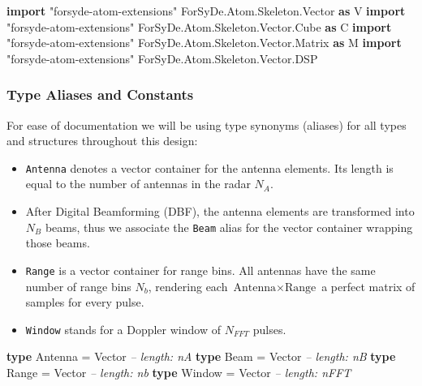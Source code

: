 \documentclass[
  a4paper,
]{article}
\newenvironment{Shaded}{}{}
\newcommand{\CommentTok}[1]{\textcolor[rgb]{0.38,0.63,0.69}{\textit{#1}}}
\newcommand{\DataTypeTok}[1]{\textcolor[rgb]{0.56,0.13,0.00}{#1}}
\newcommand{\FunctionTok}[1]{\textcolor[rgb]{0.02,0.16,0.49}{#1}}
\newcommand{\KeywordTok}[1]{\textcolor[rgb]{0.00,0.44,0.13}{\textbf{#1}}}
\newcommand{\NormalTok}[1]{#1}
\begin{document}
\begin{Shaded}
\begin{Highlighting}[numbers=left,,firstnumber=74,]
\KeywordTok{import}\NormalTok{ "forsyde-atom-extensions" }\DataTypeTok{ForSyDe.Atom.Skeleton.Vector}        \KeywordTok{as} \DataTypeTok{V}
\KeywordTok{import}\NormalTok{ "forsyde-atom-extensions" }\DataTypeTok{ForSyDe.Atom.Skeleton.Vector.Cube}   \KeywordTok{as} \DataTypeTok{C}
\KeywordTok{import}\NormalTok{ "forsyde-atom-extensions" }\DataTypeTok{ForSyDe.Atom.Skeleton.Vector.Matrix} \KeywordTok{as} \DataTypeTok{M}
\KeywordTok{import}\NormalTok{ "forsyde-atom-extensions" }\DataTypeTok{ForSyDe.Atom.Skeleton.Vector.DSP}
\end{Highlighting}
\end{Shaded}

\hypertarget{sec:aliases-shallow}{%
\subsubsection{Type Aliases and Constants}\label{sec:aliases-shallow}}

For ease of documentation we will be using type synonyms (aliases) for
all types and structures throughout this design:

\begin{itemize}
\item
  \texttt{Antenna} denotes a vector container for the antenna elements.
  Its length is equal to the number of antennas in the radar \(N_A\).
\item
  After Digital Beamforming (DBF), the antenna elements are transformed
  into \(N_B\) beams, thus we associate the \texttt{Beam} alias for the
  vector container wrapping those beams.
\item
  \texttt{Range} is a vector container for range bins. All antennas have
  the same number of range bins \(N_b\), rendering each
  \(\text{Antenna} \times \text{Range}\) a perfect matrix of samples for
  every pulse.
\item
  \texttt{Window} stands for a Doppler window of \(N_{FFT}\) pulses.
\end{itemize}

\begin{Shaded}
\begin{Highlighting}[numbers=left,,firstnumber=97,]
\KeywordTok{type} \DataTypeTok{Antenna}     \FunctionTok{=} \DataTypeTok{Vector} \CommentTok{-- length: nA}
\KeywordTok{type} \DataTypeTok{Beam}        \FunctionTok{=} \DataTypeTok{Vector} \CommentTok{-- length: nB}
\KeywordTok{type} \DataTypeTok{Range}       \FunctionTok{=} \DataTypeTok{Vector} \CommentTok{-- length: nb}
\KeywordTok{type} \DataTypeTok{Window}      \FunctionTok{=} \DataTypeTok{Vector} \CommentTok{-- length: nFFT}
\end{Highlighting}
\end{Shaded}
\end{document}
